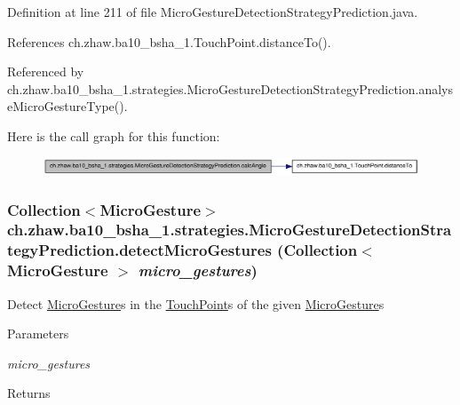 Definition at line 211 of file MicroGestureDetectionStrategyPrediction.java.

References ch.zhaw.ba10\_\-bsha\_\-1.TouchPoint.distanceTo().

Referenced by ch.zhaw.ba10\_\-bsha\_\-1.strategies.MicroGestureDetectionStrategyPrediction.analyseMicroGestureType().

Here is the call graph for this function:\nopagebreak
\begin{figure}[H]
\begin{center}
\leavevmode
\includegraphics[width=341pt]{classch_1_1zhaw_1_1ba10__bsha__1_1_1strategies_1_1MicroGestureDetectionStrategyPrediction_a853328dde879f43b609cf85e698c64cf_cgraph}
\end{center}
\end{figure}
\hypertarget{classch_1_1zhaw_1_1ba10__bsha__1_1_1strategies_1_1MicroGestureDetectionStrategyPrediction_af8639be36ae7218b7f7d2feee8edc86f}{
\subsubsection[{detectMicroGestures}]{\setlength{\rightskip}{0pt plus 5cm}Collection$<${\bf MicroGesture}$>$ ch.zhaw.ba10\_\-bsha\_\-1.strategies.MicroGestureDetectionStrategyPrediction.detectMicroGestures (Collection$<$ {\bf MicroGesture} $>$ {\em micro\_\-gestures})}}
\label{classch_1_1zhaw_1_1ba10__bsha__1_1_1strategies_1_1MicroGestureDetectionStrategyPrediction_af8639be36ae7218b7f7d2feee8edc86f}
Detect \hyperlink{}{MicroGesture}s in the \hyperlink{classch_1_1zhaw_1_1ba10__bsha__1_1_1TouchPoint}{TouchPoint}s of the given \hyperlink{}{MicroGesture}s


\begin{DoxyParams}{Parameters}
\item[{\em micro\_\-gestures}]\end{DoxyParams}
\begin{DoxyReturn}{Returns}

\end{DoxyReturn}



